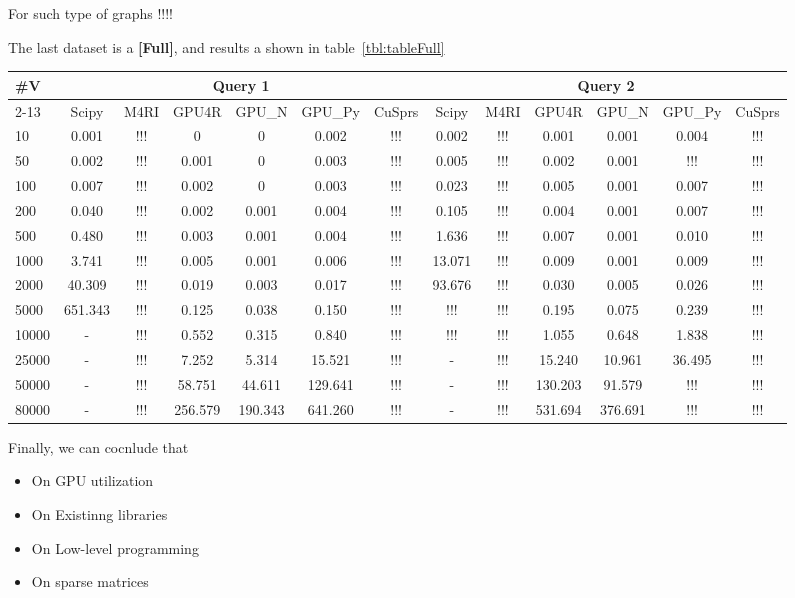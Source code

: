 For such type of graphs !!!!

The last dataset is a \textbf{[Full]}, and results a shown in table~\ref{tbl:tableFull}


\begin{table*}
\caption{Full querying results}
\label{tbl:tableFull}
\begin{tabular}{| l | c | c | c | c | c | c | c | c | c | c | c | c |}
    \hline
    \multirow{2}{*}{\#V} & \multicolumn{6}{|c|}{Query 1}                               & \multicolumn{6}{|c|}{Query 2} \\
    \cline{2-13}
                         & Scipy   & M4RI    & GPU4R   & GPU\_N  & GPU\_Py & CuSprs & Scipy  & M4RI & GPU4R   & GPU\_N  & GPU\_Py & CuSprs \\
    \hline
    \hline
    10                   & 0.001   & !!!     & 0       & 0       & 0.002   & !!!    & 0.002  & !!!  & 0.001   & 0.001   & 0.004   & !!!    \\
    50                   & 0.002   & !!!     & 0.001   & 0       & 0.003   & !!!    & 0.005  & !!!  & 0.002   & 0.001   & !!!     & !!!    \\
    100                  & 0.007   & !!!     & 0.002   & 0       & 0.003   & !!!    & 0.023  & !!!  & 0.005   & 0.001   & 0.007   & !!!    \\
    200                  & 0.040   & !!!     & 0.002   & 0.001   & 0.004   & !!!    & 0.105  & !!!  & 0.004   & 0.001   & 0.007   & !!!    \\
    500                  & 0.480   & !!!     & 0.003   & 0.001   & 0.004   & !!!    & 1.636  & !!!  & 0.007   & 0.001   & 0.010   & !!!    \\
    1000                 & 3.741   & !!!     & 0.005   & 0.001   & 0.006   & !!!    & 13.071 & !!!  & 0.009   & 0.001   & 0.009   & !!!    \\
    2000                 & 40.309  & !!!     & 0.019   & 0.003   & 0.017   & !!!    & 93.676 & !!!  & 0.030   & 0.005   & 0.026   & !!!    \\
    5000                 & 651.343 & !!!     & 0.125   & 0.038   & 0.150   & !!!    & !!!    & !!!  & 0.195   & 0.075   & 0.239   & !!!    \\
    10000                & -       & !!!     & 0.552   & 0.315   & 0.840   & !!!    & !!!    & !!!  & 1.055   & 0.648   & 1.838   & !!!    \\
    25000                & -       & !!!     & 7.252   & 5.314   & 15.521  & !!!    & -      & !!!  & 15.240  & 10.961  & 36.495  & !!!    \\
    50000                & -       & !!!     & 58.751  & 44.611  & 129.641 & !!!    & -      & !!!  & 130.203 & 91.579  & !!!     & !!!    \\
    80000                & -       & !!!     & 256.579 & 190.343 & 641.260 & !!!    & -      & !!!  & 531.694 & 376.691 & !!!     & !!!    \\

    \hline
  \end{tabular}
\end{table*}


Finally, we can cocnlude that
\begin{itemize}
\item On GPU utilization
\item On Existinng libraries
\item On Low-level programming
\item On sparse matrices
\end{itemize}
